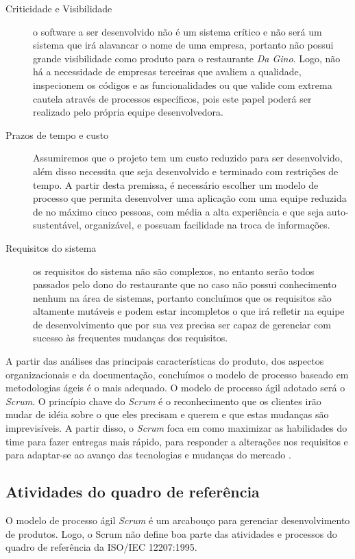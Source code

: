 \begin{description}
  \item [Criticidade e Visibilidade] o software a ser desenvolvido não é um sistema crítico e não será um sistema que irá alavancar o nome de uma empresa, portanto não possui grande visibilidade como produto para o restaurante \textit{Da Gino}. Logo, não há a necessidade de empresas terceiras que avaliem a qualidade, inspecionem os códigos e as funcionalidades ou que valide com extrema cautela através de processos específicos, pois este papel poderá ser realizado pelo própria equipe desenvolvedora.
  \item [Prazos de tempo e custo] Assumiremos que o projeto tem um custo reduzido para ser desenvolvido, além disso necessita que seja desenvolvido e terminado com restrições de tempo. A partir desta premissa, é necessário escolher um modelo de processo que permita desenvolver uma aplicação com uma equipe reduzida de no máximo cinco pessoas, com média a alta experiência e que seja auto-sustentável, organizável, e possuam facilidade na troca de informações.

  \item [Requisitos do sistema] os requisitos do sistema não são complexos, no entanto serão todos passados pelo dono do restaurante que no caso não possui conhecimento nenhum na área de sistemas, portanto concluímos que os requisitos são altamente mutáveis e podem estar incompletos o que irá refletir na equipe de desenvolvimento que por sua vez precisa ser capaz de gerenciar com sucesso às frequentes mudanças dos requisitos.
\end{description}

A partir das análises das principais características do produto, dos aspectos organizacionais e da documentação, concluímos o modelo de processo baseado em metodologias ágeis é o mais adequado. O modelo de processo ágil adotado será o \textit{Scrum}. O princípio chave do \textit{Scrum} é o reconhecimento que os clientes irão mudar de idéia sobre o que eles precisam e querem e que estas mudanças são imprevisíveis. A partir disso, o \textit{Scrum} foca em como maximizar as habilidades do time para fazer entregas mais rápido, para responder a alterações nos requisitos e para adaptar-se ao avanço das tecnologias e mudanças do mercado \cite{scrumwiki:17}.


\subsection{Atividades do quadro de referência}
O modelo de processo ágil \textit{Scrum} é um arcabouço para gerenciar desenvolvimento de produtos. Logo, o Scrum não define boa parte das atividades e processos do quadro de referência da ISO/IEC 12207:1995. 

